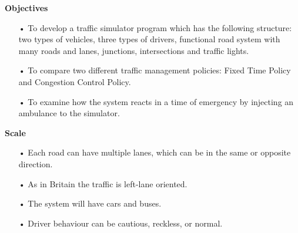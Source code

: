 \documentclass[11pt]{article}
\begin{document}
\textbf{Objectives}
\begin{itemize}
\item[•] To develop a traffic simulator program which has the following structure: two types of vehicles, three types of drivers, functional road system with many roads and lanes, junctions, intersections and traffic lights.
\item[•] To compare two different traffic management policies: Fixed Time Policy and Congestion Control Policy.
\item[•] To examine how the system reacts in a time of emergency by injecting an ambulance to the simulator.
\end{itemize}

\textbf{Scale}
\begin{itemize}
\item[•] Each road can have multiple lanes, which can be in the same or opposite direction.
\item[•] As in Britain the traffic is left-lane oriented.
\item[•] The system will have cars and buses.
\item[•] Driver behaviour can be cautious, reckless, or normal.
\end{itemize}
\end{document}
